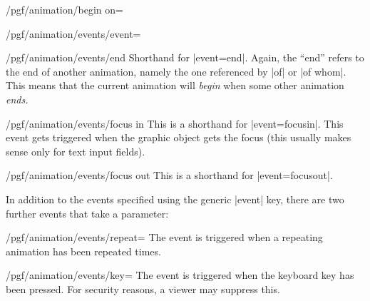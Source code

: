 \begin{key}{/pgf/animation/begin on=}
\begin{key}{/pgf/animation/events/event=}
    \begin{key}{/pgf/animation/events/end}
      Shorthand for |event=end|. Again, the ``end'' refers to the
      end of another animation, namely the one referenced by
      |of| or |of whom|. This means that the current animation will
      \emph{begin} when some other animation \emph{ends.}
\begin{codeexample}[width=2cm]
\end{codeexample}
    \end{key}
    \begin{key}{/pgf/animation/events/focus in}
      This is a shorthand for |event=focusin|. This event gets
      triggered when the graphic object gets the focus (this usually
      makes sense only for text input fields).
    \end{key}
    \begin{key}{/pgf/animation/events/focus out}
      This is a shorthand for |event=focusout|.
    \end{key}
  \end{key}

  In addition to the events specified using the generic |event| key,
  there are two further events that take a parameter:
  \begin{key}{/pgf/animation/events/repeat=}
    The event is triggered when a repeating animation has been
    repeated  times.
\begin{codeexample}[width=2cm]
\end{codeexample}
  \end{key}
  
  \begin{key}{/pgf/animation/events/key=}
    The event is triggered when the keyboard key  has been
    pressed. For security reasons, a viewer may suppress this.
  \end{key}
  

\end{key}

